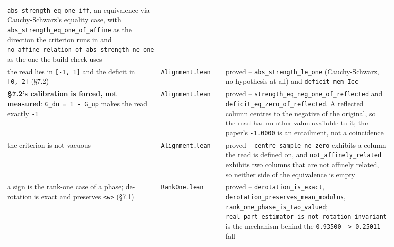 \documentclass[10pt,letterpaper,twocolumn]{article}
\begin{document}
\begin{center}
{\begin{xtabular}{L{0.264\linewidth}L{0.228\linewidth}L{0.405\linewidth}}
\texttt{abs\_\allowbreak{}strength\_\allowbreak{}eq\_\allowbreak{}one\_\allowbreak{}iff},
an equivalence via Cauchy-Schwarz's equality case, with
\texttt{abs\_\allowbreak{}strength\_\allowbreak{}eq\_\allowbreak{}one\_\allowbreak{}of\_\allowbreak{}affine}
as the direction the criterion runs in and
\texttt{no\_\allowbreak{}affine\_\allowbreak{}relation\_\allowbreak{}of\_\allowbreak{}abs\_\allowbreak{}strength\_\allowbreak{}ne\_\allowbreak{}one}
as the one the build check uses \\
the read lies in
\texttt{[\allowbreak{}-{}\allowbreak{}1,\allowbreak{}\ 1]\allowbreak{}}
and the deficit in
\texttt{[\allowbreak{}0,\allowbreak{}\ 2]\allowbreak{}} (§7.2) & \texttt{Alignment.\allowbreak{}lean} & proved --
\texttt{abs\_\allowbreak{}strength\_\allowbreak{}le\_\allowbreak{}one}
(Cauchy-Schwarz, no hypothesis at all) and
\texttt{deficit\_\allowbreak{}mem\_\allowbreak{}Icc} \\
\textbf{§7.2's calibration is forced, not measured}:
\texttt{G\_\allowbreak{}dn\ =\allowbreak{}\ 1\ -{}\allowbreak{}\ G\_\allowbreak{}up}
makes the read exactly \texttt{-{}\allowbreak{}1} & \texttt{Alignment.\allowbreak{}lean} & proved --
\texttt{strength\_\allowbreak{}eq\_\allowbreak{}neg\_\allowbreak{}one\_\allowbreak{}of\_\allowbreak{}reflected}
and
\texttt{deficit\_\allowbreak{}eq\_\allowbreak{}zero\_\allowbreak{}of\_\allowbreak{}reflected}.
A reflected column centres to the negative of the original, so the read
has no other value available to it; the paper's
\texttt{-{}\allowbreak{}1.\allowbreak{}0000} is an entailment, not a
coincidence \\
the criterion is not vacuous & \texttt{Alignment.\allowbreak{}lean} & proved --
\texttt{centre\_\allowbreak{}sample\_\allowbreak{}ne\_\allowbreak{}zero}
exhibits a column the read is defined on, and
\texttt{not\_\allowbreak{}affinely\_\allowbreak{}related} exhibits two
columns that are not affinely related, so neither side of the
equivalence is empty \\
a sign is the rank-one case of a phase; de-rotation is exact and
preserves
\texttt{\textbar{}\allowbreak{}\textless{}\allowbreak{}w\textgreater{}\allowbreak{}\textbar{}\allowbreak{}}
(§7.1) & \texttt{RankOne.\allowbreak{}lean} & proved -- \texttt{derotation\_\allowbreak{}is\_\allowbreak{}exact},
\texttt{derotation\_\allowbreak{}preserves\_\allowbreak{}mean\_\allowbreak{}modulus},
\texttt{rank\_\allowbreak{}one\_\allowbreak{}phase\_\allowbreak{}is\_\allowbreak{}two\_\allowbreak{}valued};
\texttt{real\_\allowbreak{}part\_\allowbreak{}estimator\_\allowbreak{}is\_\allowbreak{}not\_\allowbreak{}rotation\_\allowbreak{}invariant}
is the mechanism behind the
\texttt{0.\allowbreak{}93500\ -{}\allowbreak{}\textgreater{}\allowbreak{}\ 0.\allowbreak{}25011}
fall \\
\end{xtabular}
}
\end{center}
\end{document}
